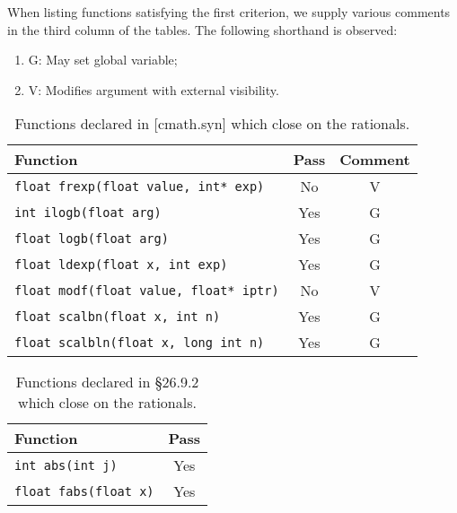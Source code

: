 \documentclass[prd,twocolumn,amsmath,amssymb,nofootinbib,eqsecnum]{revtex4-1}
\newcommand{\code}[1]{{\tt #1}}
\begin{document}
When listing functions satisfying the first criterion, we supply various comments in the
third column of the tables. The following shorthand is observed:
\begin{enumerate}
	\item G: May set global variable;
	
	\item V: Modifies argument with external visibility.
\end{enumerate}

\begin{table}[h]
	\begin{tabular}{lcc}
		Function & Pass & Comment
	\\
	\hline \hline
		\code{float frexp(float value, int* exp)} & No & V
	\\
	\hline
		\code{int ilogb(float arg)} & Yes & G
	\\
	\hline
		\code{float logb(float arg)} & Yes & G
	\\
	\hline
		\code{float ldexp(float x, int exp)} & Yes & G
	\\
	\hline
		\code{float modf(float value, float* iptr)} & No & V
	\\
	\hline
		\code {float scalbn(float x, int n)} & Yes & G
	\\
	\hline
		\code {float scalbln(float x, long int n)} & Yes & G
	\end{tabular}
\caption{Functions declared in [cmath.syn] which close on the rationals.}
\label{tab:26.9.1}
\end{table}


\begin{table}[h]
	\begin{tabular}{lc}
		Function & Pass
	\\
	\hline \hline
		\code{int abs(int j)} & Yes
	\\
	\hline
		\code{float fabs(float x)} & Yes
	\end{tabular}
\caption{Functions declared in \S 26.9.2 which close on the rationals.}
\label{tab:26.9.2}
\end{table}
\end{document}
